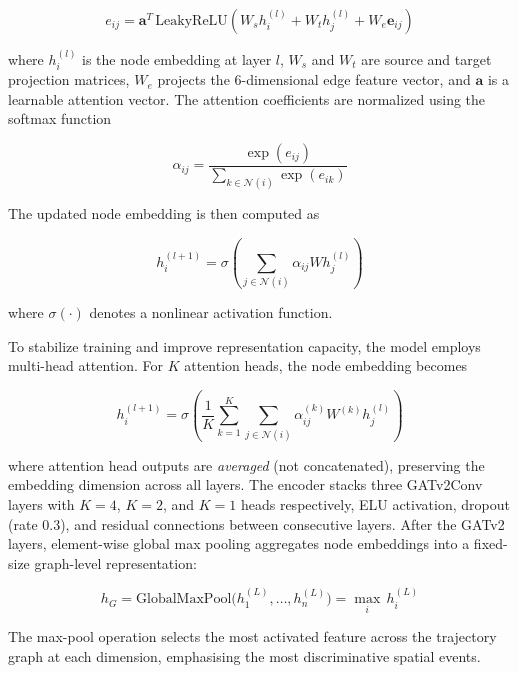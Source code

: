\documentclass[conference]{IEEEtran}
\begin{document}
\begin{equation}
e_{ij} = \mathbf{a}^T \, \text{LeakyReLU}\!\left(W_s h_i^{(l)} + W_t h_j^{(l)} + W_e \mathbf{e}_{ij}\right)
\end{equation}

where $h_i^{(l)}$ is the node embedding at layer $l$, $W_s$ and $W_t$ are source and target projection matrices, $W_e$ projects the 6-dimensional edge feature vector, and $\mathbf{a}$ is a learnable attention vector. The attention coefficients are normalized using the softmax function

\begin{equation}
\alpha_{ij} = \frac{\exp(e_{ij})}{\sum_{k \in \mathcal{N}(i)} \exp(e_{ik})}
\end{equation}

The updated node embedding is then computed as

\begin{equation}
h_i^{(l+1)} = \sigma \left( \sum_{j \in \mathcal{N}(i)} \alpha_{ij} W h_j^{(l)} \right)
\end{equation}

where $\sigma(\cdot)$ denotes a nonlinear activation function.

To stabilize training and improve representation capacity, the model employs multi-head attention. For $K$ attention heads, the node embedding becomes

\begin{equation}
h_i^{(l+1)} = \sigma \!\left( \frac{1}{K} \sum_{k=1}^{K} \sum_{j \in \mathcal{N}(i)} \alpha_{ij}^{(k)} W^{(k)} h_j^{(l)} \right)
\end{equation}

where attention head outputs are \emph{averaged} (not concatenated), preserving the embedding dimension across all layers. The encoder stacks three GATv2Conv layers with $K=4$, $K=2$, and $K=1$ heads respectively, ELU activation, dropout (rate 0.3), and residual connections between consecutive layers. After the GATv2 layers, element-wise global max pooling aggregates node embeddings into a fixed-size graph-level representation:

\begin{equation}
h_G = \text{GlobalMaxPool}\bigl(h_1^{(L)}, \ldots, h_n^{(L)}\bigr) = \max_i\, h_i^{(L)}
\end{equation}

The max-pool operation selects the most activated feature across the trajectory graph at each dimension, emphasising the most discriminative spatial events.
\end{document}
